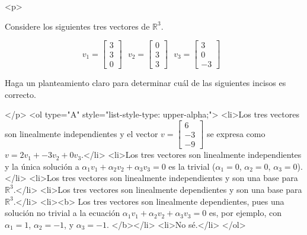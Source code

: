 
<p>

    Considere los siguientes tres vectores de $\mathbb{R}^3$.

    $$
    v_1=\begin{bmatrix} 3 \\ 3 \\ 0 \end{bmatrix} \ \ \ 
    v_2=\begin{bmatrix} 0 \\ 3 \\ 3 \end{bmatrix} \ \ \ 
    v_3=\begin{bmatrix} 3 \\ 0 \\ -3 \end{bmatrix} \ \ \ 
    $$

    Haga un planteamiento claro para determinar cuál de las siguientes incisos es correcto.
    
</p>
<ol type="A" style="list-style-type: upper-alpha;">
    <li>Los tres vectores son linealmente independientes y el vector $v=\begin{bmatrix} 6 \\ -3 \\ -9 \end{bmatrix}$ se expresa como $v=2v_1+-3v_2+0v_3$.</li>
<li>Los tres vectores son linealmente independientes y la única solución a $\alpha_1v_1+\alpha_2v_2+\alpha_3v_3=0$ es la trivial ($\alpha_1=0$, $\alpha_2=0$, $\alpha_3=0$).</li>
<li>Los tres vectores son linealmente independientes y son una base para $\mathbb{R}^3$.</li>
<li>Los tres vectores son linealmente dependientes y son una base para $\mathbb{R}^3$.</li>
<li><b>
    Los tres vectores son linealmente dependientes, pues una solución no trivial a la ecuación $\alpha_1v_1+\alpha_2v_2+\alpha_3v_3=0$ es, por ejemplo, con $\alpha_1=1$, $\alpha_2=-1$, y $\alpha_3=-1$.
    </b></li>
<li>No sé.</li>
</ol>

